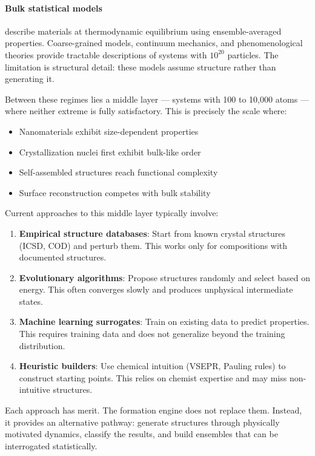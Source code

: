 \documentclass[11pt]{article}
\begin{document}
\paragraph{Bulk statistical models} describe materials at thermodynamic equilibrium using ensemble-averaged properties. Coarse-grained models, continuum mechanics, and phenomenological theories provide tractable descriptions of systems with $10^{20}$ particles. The limitation is structural detail: these models assume structure rather than generating it.

Between these regimes lies a middle layer — systems with 100 to 10,000 atoms — where neither extreme is fully satisfactory. This is precisely the scale where:

\begin{itemize}
\item Nanomaterials exhibit size-dependent properties
\item Crystallization nuclei first exhibit bulk-like order
\item Self-assembled structures reach functional complexity
\item Surface reconstruction competes with bulk stability
\end{itemize}

Current approaches to this middle layer typically involve:

\begin{enumerate}
\item \textbf{Empirical structure databases}: Start from known crystal structures (ICSD, COD) and perturb them. This works only for compositions with documented structures.

\item \textbf{Evolutionary algorithms}: Propose structures randomly and select based on energy. This often converges slowly and produces unphysical intermediate states.

\item \textbf{Machine learning surrogates}: Train on existing data to predict properties. This requires training data and does not generalize beyond the training distribution.

\item \textbf{Heuristic builders}: Use chemical intuition (VSEPR, Pauling rules) to construct starting points. This relies on chemist expertise and may miss non-intuitive structures.
\end{enumerate}

Each approach has merit. The formation engine does not replace them. Instead, it provides an alternative pathway: generate structures through physically motivated dynamics, classify the results, and build ensembles that can be interrogated statistically.
\end{document}
